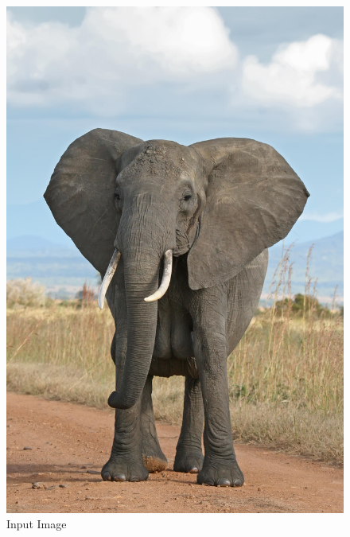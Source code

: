 \documentclass[12pt]{article}
\begin{document}
\begin{figure}[!htb]
    \begin{minipage}{0.48\textwidth}
        \centering
        \includegraphics[width=0.9\linewidth]{large_elephant.jpg}
        \caption{Input Image}
    \end{minipage}\hfill
    \begin{minipage}{0.48\textwidth}
        \centering

\end{minipage}
\end{figure}
\end{document}
